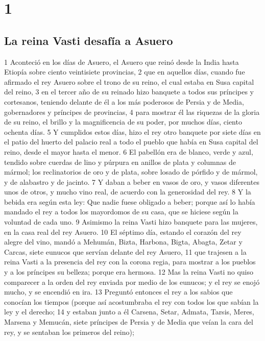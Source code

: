 
\chapter{1}

\section*{La reina Vasti desafía a Asuero}

1 Aconteció en los días de Asuero, el Asuero que reinó desde la India hasta Etiopía sobre ciento veintisiete provincias,
2 que en aquellos días, cuando fue afirmado el rey Asuero sobre el trono de su reino, el cual estaba en Susa capital del reino,
3 en el tercer año de su reinado hizo banquete a todos sus príncipes y cortesanos, teniendo delante de él a los más poderosos de Persia y de Media, gobernadores y príncipes de provincias,
4 para mostrar él las riquezas de la gloria de su reino, el brillo y la magnificencia de su poder, por muchos días, ciento ochenta días.
5 Y cumplidos estos días, hizo el rey otro banquete por siete días en el patio del huerto del palacio real a todo el pueblo que había en Susa capital del reino, desde el mayor hasta el menor.
6 El pabellón era de blanco, verde y azul, tendido sobre cuerdas de lino y púrpura en anillos de plata y columnas de mármol; los reclinatorios de oro y de plata, sobre losado de pórfido y de mármol, y de alabastro y de jacinto.
7 Y daban a beber en vasos de oro, y vasos diferentes unos de otros, y mucho vino real, de acuerdo con la generosidad del rey.
8 Y la bebida era según esta ley: Que nadie fuese obligado a beber; porque así lo había mandado el rey a todos los mayordomos de su casa, que se hiciese según la voluntad de cada uno.
9 Asimismo la reina Vasti hizo banquete para las mujeres, en la casa real del rey Asuero.
10 El séptimo día, estando el corazón del rey alegre del vino, mandó a Mehumán, Bizta, Harbona, Bigta, Abagta, Zetar y Carcas, siete eunucos que servían delante del rey Asuero,
11 que trajesen a la reina Vasti a la presencia del rey con la corona regia, para mostrar a los pueblos y a los príncipes su belleza; porque era hermosa.
12 Mas la reina Vasti no quiso comparecer a la orden del rey enviada por medio de los eunucos; y el rey se enojó mucho, y se encendió en ira.
13 Preguntó entonces el rey a los sabios que conocían los tiempos (porque así acostumbraba el rey con todos los que sabían la ley y el derecho; 
14 y estaban junto a él Carsena, Setar, Admata, Tarsis, Meres, Marsena y Memucán, siete príncipes de Persia y de Media que veían la cara del rey, y se sentaban los primeros del reino);
